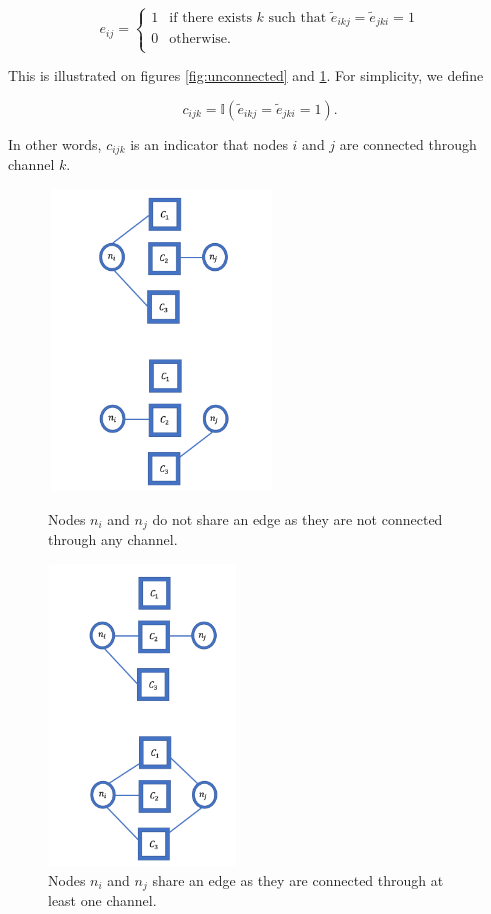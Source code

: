 \documentclass[11pt]{amsart}
\newcommand{\edge}{e}
\newcommand{\latentedge}{\tilde e}
\newcommand{\latcon}[3]{c_{#1#2#3} }
\begin{document}
\[
\edge_{ij} = 
\begin{cases}
1 & \text{if there exists } k \text{ such that } \latentedge_{ikj} = \latentedge_{jki} = 1 \\
0 & \text{otherwise}.\\
\end{cases}
\]

This is illustrated on figures \ref{fig:unconnected} and \ref{fig:connected}. For simplicity, we define

\begin{equation}\label{eq:hubConDef}
\latcon{i}{j}{k} = \mathbb{I}( \latentedge_{ikj} = \latentedge_{jki} = 1 ).
\end{equation}

In other words, $\latcon{i}{j}{k}$ is an indicator that nodes $i$ and $j$ are connected through channel $k$. 

\begin{figure}
\centering
\begin{minipage}{0.5\textwidth}
\includegraphics[width = 6cm, height = 8cm]{LatentUnconnected.png}
\caption{Nodes $n_i$ and $n_j$ do not share an edge as they are not connected through any channel.}
\label{fig:unconnected}
\end{minipage}%
\begin{minipage}{0.5\textwidth}
\includegraphics[width = 5cm, height = 8cm]{LatentConnected.png}
\caption{Nodes $n_i$ and $n_j$ share an edge as they are  connected through at least one channel.}
\label{fig:connected}
\end{minipage}
\end{figure}
\end{document}
